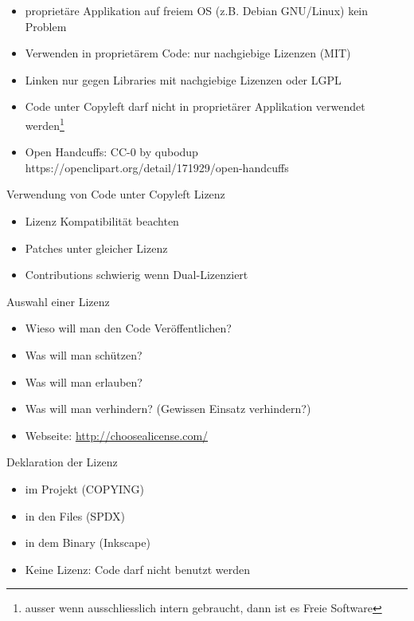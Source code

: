 \note
{
	\begin{itemize}
		\item proprietäre Applikation auf freiem OS (z.B. Debian GNU/Linux) kein Problem
		\item Verwenden in proprietärem Code: nur nachgiebige Lizenzen (MIT)
		\item Linken nur gegen Libraries mit nachgiebige Lizenzen oder LGPL
		\item Code unter Copyleft darf nicht in proprietärer Applikation verwendet werden\footnote{ausser wenn ausschliesslich intern gebraucht, dann ist es Freie Software}
		\item Open Handcuffs: CC-0 by qubodup https://openclipart.org/detail/171929/open-handcuffs
	\end{itemize}
}

\begin{frame}{Verwendung von Code unter Copyleft Lizenz}
	\begin{itemize}
		\item Lizenz Kompatibilität beachten
		\item Patches unter gleicher Lizenz
		\item Contributions schwierig wenn Dual-Lizenziert
	\end{itemize}
\end{frame}

\begin{frame}{Auswahl einer Lizenz}
	\begin{itemize}
		\item Wieso will man den Code Veröffentlichen? 
		\item Was will man schützen?
		\item Was will man erlauben?
		\item Was will man verhindern? (Gewissen Einsatz verhindern?)
		\item Webseite: \url{http://choosealicense.com/}
	\end{itemize}
\end{frame}

\begin{frame}{Deklaration der Lizenz}
	\begin{itemize}
		\item im Projekt (COPYING)
		\item in den Files (SPDX)
		\item in dem Binary (Inkscape)
		\item Keine Lizenz: Code darf nicht benutzt werden
	\end{itemize}
\end{frame}

